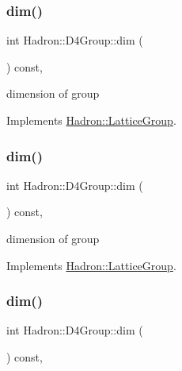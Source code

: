 \subsubsection{\texorpdfstring{dim()}{dim()}\hspace{0.1cm}{\footnotesize\ttfamily [1/3]}}
{\footnotesize\ttfamily int Hadron\+::\+D4\+Group\+::dim (\begin{DoxyParamCaption}{ }\end{DoxyParamCaption}) const\hspace{0.3cm}{\ttfamily [inline]}, {\ttfamily [virtual]}}

dimension of group 

Implements \mbox{\hyperlink{structHadron_1_1LatticeGroup_abd8415698323796ef6a8605796ee3bea}{Hadron\+::\+Lattice\+Group}}.

\mbox{\label{structHadron_1_1D4Group_a5969c3afe94d4c6ada166f7dc161a355}} 
\subsubsection{\texorpdfstring{dim()}{dim()}\hspace{0.1cm}{\footnotesize\ttfamily [2/3]}}
{\footnotesize\ttfamily int Hadron\+::\+D4\+Group\+::dim (\begin{DoxyParamCaption}{ }\end{DoxyParamCaption}) const\hspace{0.3cm}{\ttfamily [inline]}, {\ttfamily [virtual]}}

dimension of group 

Implements \mbox{\hyperlink{structHadron_1_1LatticeGroup_abd8415698323796ef6a8605796ee3bea}{Hadron\+::\+Lattice\+Group}}.

\mbox{\label{structHadron_1_1D4Group_a5969c3afe94d4c6ada166f7dc161a355}} 
\subsubsection{\texorpdfstring{dim()}{dim()}\hspace{0.1cm}{\footnotesize\ttfamily [3/3]}}
{\footnotesize\ttfamily int Hadron\+::\+D4\+Group\+::dim (\begin{DoxyParamCaption}{ }\end{DoxyParamCaption}) const\hspace{0.3cm}{\ttfamily [inline]}, {\ttfamily [virtual]}}

